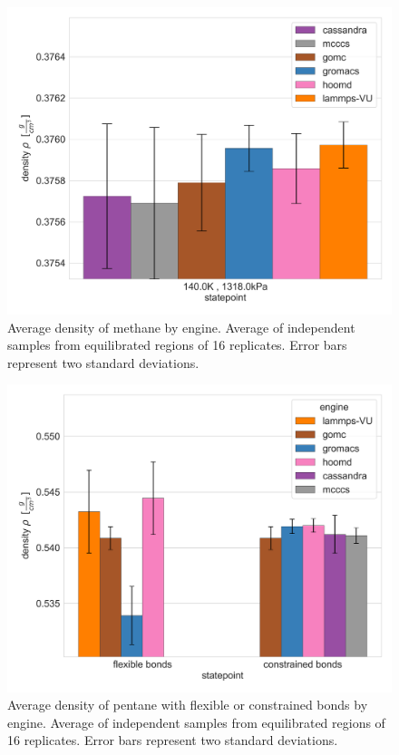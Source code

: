 \begin{figure}[h!]
    \centering
    \includegraphics[width=0.8\linewidth,keepaspectratio]{figures/rep_study/methaneUA_summary.png}
    \caption{Average density of methane by engine. Average of independent samples from equilibrated regions of 16 replicates. Error bars represent two standard deviations.}\label{fig:methane_density}
\end{figure}

\begin{figure}[h!]
    \centering
    \includegraphics[width=0.8\linewidth,keepaspectratio]{figures/rep_study/pentane_summary.png}
    \caption{Average density of pentane with flexible or constrained bonds by engine. Average of independent samples from equilibrated regions of 16 replicates. Error bars represent two standard deviations.}\label{fig:pentane_density}
\end{figure}

